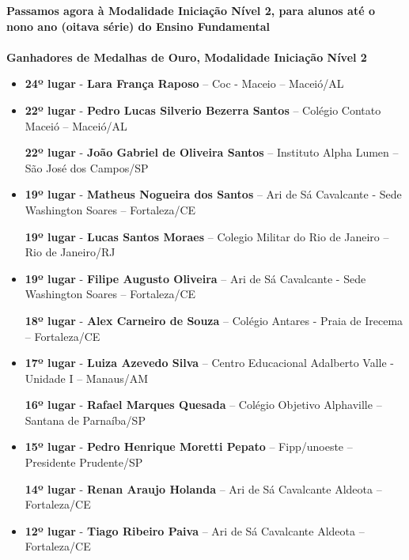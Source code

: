 \documentclass{article}
\begin{document}
\color{blue}
\textbf{Passamos agora à Modalidade Iniciação Nível 2, para alunos até o nono ano (oitava série) do Ensino Fundamental}\\\\
\textbf{\color{blue}Ganhadores de Medalhas de Ouro, \color{black}Modalidade Iniciação Nível 2}
\color{black}

\begin{itemize}
\item
\textbf{24º lugar} - \textbf{Lara França Raposo} – Coc - Maceio – Maceió/AL


\item
\textbf{22º lugar} - \textbf{Pedro Lucas Silverio Bezerra Santos} – Colégio Contato Maceió – Maceió/AL


\textbf{22º lugar} - \textbf{João Gabriel de Oliveira Santos} – Instituto Alpha Lumen – São José dos Campos/SP



\item
\textbf{19º lugar} - \textbf{Matheus Nogueira dos Santos} – Ari de Sá Cavalcante - Sede Washington Soares – Fortaleza/CE


\textbf{19º lugar} - \textbf{Lucas Santos Moraes} – Colegio Militar do Rio de Janeiro – Rio de Janeiro/RJ



\item
\textbf{19º lugar} - \textbf{Filipe Augusto Oliveira} – Ari de Sá Cavalcante - Sede Washington Soares – Fortaleza/CE


\textbf{18º lugar} - \textbf{Alex Carneiro de Souza} – Colégio Antares - Praia de Irecema – Fortaleza/CE



\item
\textbf{17º lugar} - \textbf{Luiza Azevedo Silva} – Centro Educacional Adalberto Valle - Unidade I – Manaus/AM


\textbf{16º lugar} - \textbf{Rafael Marques Quesada} – Colégio Objetivo Alphaville – Santana de Parnaíba/SP



\item
\textbf{15º lugar} - \textbf{Pedro Henrique Moretti Pepato} – Fipp/unoeste – Presidente Prudente/SP


\textbf{14º lugar} - \textbf{Renan Araujo Holanda} – Ari de Sá Cavalcante Aldeota – Fortaleza/CE



\item
\textbf{12º lugar} - \textbf{Tiago Ribeiro Paiva} – Ari de Sá Cavalcante Aldeota – Fortaleza/CE



\end{itemize}
\end{document}
